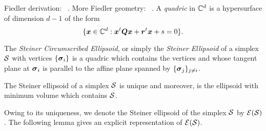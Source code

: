 \label{sec:quadrics}
\todo  {}
Fiedler derivation: ~\cite{fiedler2005geometry}. More Fiedler geometry: ~\cite{fiedler1993geometric}. 
A \emph{quadric} in $\mathbb{C}^d$ is a hypersurface of dimension $d-1$ of the form 
\begin{equation*}
\{\vb*{x}\in\mathbb{C}^d: \vb*{x}^t \vb*{Q}\vb*{x} + \vb*{r}^t \vb*{x} + s=0\}.
\end{equation*}

\begin{definition}
\label{def:steiner_ellipsoid}
The \emph{Steiner Circumscribed Ellipsoid}, or simply the \emph{Steiner Ellipsoid} of a simplex $\mathcal{S}$ with vertices $\{\vb*{\sigma}_i\}$ is a quadric which contains the vertices and whose tangent plane at $\vb*{\sigma}_i$ is parallel to the affine plane spanned by $\{\vb*{\sigma}_j\}_{j\neq i}$. 
\end{definition}

\begin{theorem}
The Steiner ellipsoid of a simplex $\mathcal{S}$ is unique and moreover, is the ellipsoid with minimum volume which contains $\mathcal{S}$. 
\end{theorem}

Owing to its uniqueness, we denote the Steiner ellipsoid of the simplex $\mathcal{S}$ by $\mathcal{E}(\mathcal{S})$. The following lemma gives an explicit representation of $\mathcal{E}(\mathcal{S})$. 

